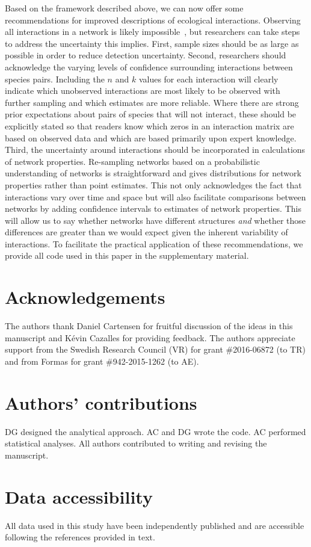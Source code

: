 \documentclass[12pt]{article}
\begin{document}
\begin{spacing}{2.0}
  Based on the framework described above, we can now offer some recommendations for improved descriptions of ecological interactions. Observing all interactions in a network is likely impossible~\citep{Jordano2016}, but researchers can take steps to address the uncertainty this implies. First, sample sizes should be as large as possible in order to reduce detection uncertainty. Second, researchers should acknowledge the varying levels of confidence surrounding interactions between species pairs. Including the $n$ and $k$ values for each interaction will clearly indicate which unobserved interactions are most likely to be observed with further sampling and which estimates are more reliable. Where there are strong prior expectations about pairs of species that will not interact, these should be explicitly stated so that readers know which zeros in an interaction matrix are based on observed data and which are based primarily upon expert knowledge. Third, the uncertainty around interactions should be incorporated in calculations of network properties. Re-sampling networks based on a probabilistic understanding of networks is straightforward and gives distributions for network properties rather than point estimates. This not only acknowledges the fact that interactions vary over time and space but will also facilitate comparisons between networks by adding confidence intervals to estimates of network properties. This will allow us to say whether networks have different structures \emph{and} whether those differences are greater than we would expect given the inherent variability of interactions. To facilitate the practical application of these recommendations, we provide all code used in this paper in the supplementary material. 


\section*{Acknowledgements}

  The authors thank Daniel Cartensen for fruitful discussion of the ideas in this manuscript and K\'{e}vin Cazalles for providing feedback. The authors appreciate support from the Swedish Research Council (VR) for grant \#2016-06872 (to TR) and from Formas for grant \#942-2015-1262 (to AE).


\section*{Authors' contributions}

DG designed the analytical approach. AC and DG wrote the code. AC performed statistical analyses. All authors contributed to writing and revising the manuscript.


\section*{Data accessibility}

All data used in this study have been independently published and are accessible following the references provided in text.



\end{spacing}
\clearpage
\end{document}
